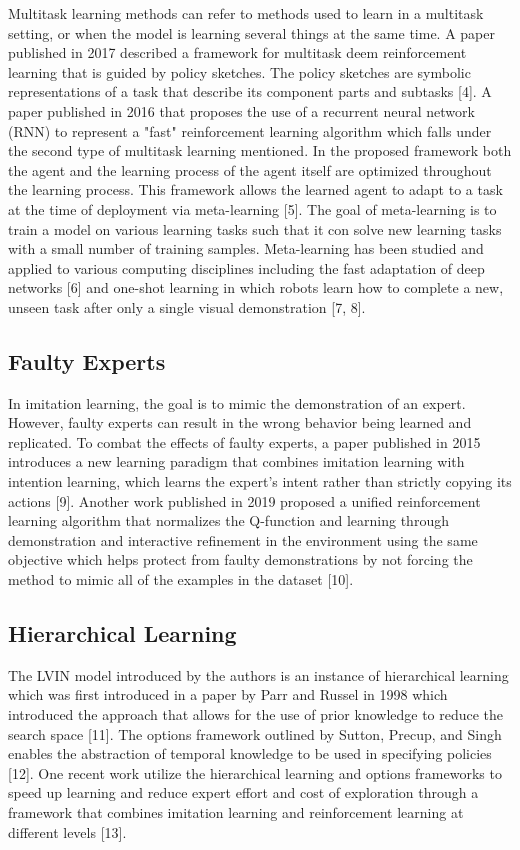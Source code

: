 \documentclass[letterpaper, 10 pt, conference]{ieeeconf}  %
\begin{document}
Multitask learning methods can refer to methods used to learn in a multitask setting, or when the model is learning several things at the same time. A paper published in 2017 described a framework for multitask deem reinforcement learning that is guided by policy sketches. The policy sketches are symbolic representations of a task that describe its component parts and subtasks [4]. A paper published in 2016 that proposes the use of a recurrent neural network (RNN) to represent a "fast" reinforcement learning algorithm which falls under the second type of multitask learning mentioned. In the proposed framework both the agent and the learning process of the agent itself are optimized throughout the learning process. This framework allows the learned agent to adapt to a task at the time of deployment via meta-learning [5].
\newline 
\indent The goal of meta-learning is to train a model on various learning tasks such that it con solve new learning tasks with a small number of training samples. Meta-learning has been studied and applied to various computing disciplines including the fast adaptation of deep networks [6] and one-shot learning in which robots learn how to complete a new, unseen task after only a single visual demonstration [7, 8]. 

\subsection{Faulty Experts}

In imitation learning, the goal is to mimic the demonstration of an expert. However, faulty experts can result in the wrong behavior being learned and replicated. To combat the effects of faulty experts, a paper published in 2015 introduces a new learning paradigm that combines imitation learning with intention learning, which learns the expert's intent rather than strictly copying its actions [9]. Another work published in 2019 proposed a unified reinforcement learning algorithm that normalizes the Q-function and learning through demonstration and interactive refinement in the environment using the same objective which helps protect from faulty demonstrations by not forcing the method to mimic all of the examples in the dataset [10].

\subsection{Hierarchical Learning}

The LVIN model introduced by the authors is an instance of hierarchical learning which was first introduced in a paper by Parr and Russel in 1998 which introduced the approach that allows for the use of prior knowledge to reduce the search space [11]. The options framework outlined by Sutton, Precup, and Singh enables the abstraction of temporal knowledge to be used in specifying policies [12]. One recent work utilize the hierarchical learning and options frameworks to speed up learning and reduce expert effort and cost of exploration through a framework that combines imitation learning and reinforcement learning at different levels [13].
\end{document}
